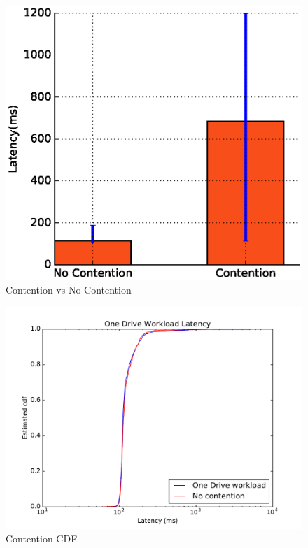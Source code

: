 \begin{figure}[t]
      \includegraphics[width=\linewidth]{plots/contention_bar}
      \caption{Contention vs No Contention}
      \label{fig:gizacontentionbar}
\end{figure}

\begin{figure}[t]
      \includegraphics[width=\linewidth]{images/Contention_cdf}
      \caption{Contention CDF}
      \label{fig:gizacontentioncdf}
\end{figure}
